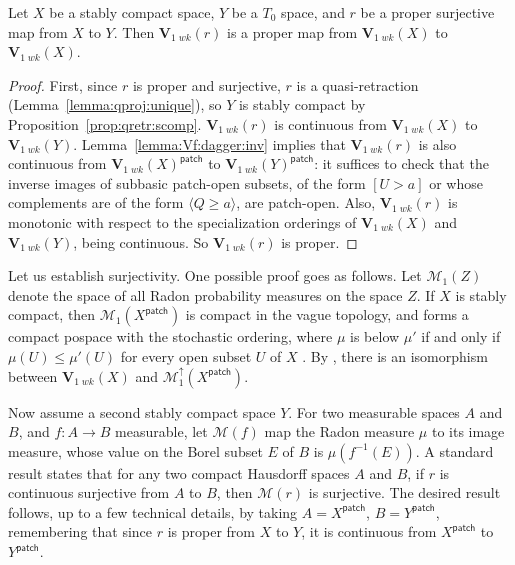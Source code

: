 \documentclass{LMCS}
\newcommand\Val{\mathbf V}
\newcommand\patch{{\mathsf{patch}}}
\begin{document}
\begin{prop}
  \label{prop:Vf:proper}
  Let $X$ be a stably compact space, $Y$ be a $T_0$ space, and $r$ be
  a proper surjective map from $X$ to $Y$.  Then $\Val_{1\;wk} (r)$ is
  a proper map from $\Val_{1\;wk} (X)$ to $\Val_{1\;wk} (X)$.
\end{prop}
\begin{proof}
  First, since $r$ is proper and surjective, $r$ is a quasi-retraction
  (Lemma~\ref{lemma:qproj:unique}), so $Y$ is stably compact by
  Proposition~\ref{prop:qretr:scomp}.  $\Val_{1\;wk} (r)$ is
  continuous from $\Val_{1\;wk} (X)$ to $\Val_{1\;wk} (Y)$.
  Lemma~\ref{lemma:Vf:dagger:inv} implies that $\Val_{1\;wk} (r)$ is
  also continuous from $\Val_{1\;wk} (X)^\patch$ to $\Val_{1\;wk}
  (Y)^\patch$: it suffices to check that the inverse images of
  subbasic patch-open subsets, of the form $[U > a]$ or whose
  complements are of the form $\langle Q \geq a\rangle$, are
  patch-open.  Also, $\Val_{1\;wk} (r)$ is monotonic with respect to
  the specialization orderings of $\Val_{1\;wk} (X)$ and $\Val_{1\;wk}
  (Y)$, being continuous.  So $\Val_{1\;wk} (r)$ is proper.
\end{proof}

Let us establish surjectivity.  One possible proof goes as follows.
Let $\mathcal M_1 (Z)$ denote the space of all Radon probability
measures on the space $Z$.  If $X$ is stably compact, then $\mathcal
M_1 (X^\patch)$ is compact in the vague topology, and forms a compact
pospace with the stochastic ordering, where $\mu$ is below $\mu'$ if
and only if $\mu (U) \leq \mu' (U)$ for every open subset $U$ of $X$
\cite[Theorem~31]{AMJK:scs:prob}.  By
\cite[Theorem~36]{AMJK:scs:prob}, there is an isomorphism between
$\Val_{1\;wk} (X)$ and $\mathcal M_1^\uparrow (X^\patch)$.

Now assume a second stably compact space $Y$.  For two measurable
spaces $A$ and $B$, and $f : A \to B$ measurable, let $\mathcal M (f)$
map the Radon measure $\mu$ to its image measure, whose value on the
Borel subset $E$ of $B$ is $\mu (f^{-1} (E))$.  A standard result
\cite[2.4, Lemma~1]{Bourbaki:int:IX} states that for any two compact
Hausdorff spaces $A$ and $B$, if $r$ is continuous surjective from $A$
to $B$, then $\mathcal M (r)$ is surjective.  The desired result
follows, up to a few technical details, by taking $A=X^\patch$,
$B=Y^\patch$, remembering that since $r$ is proper from $X$ to $Y$, it
is continuous from $X^\patch$ to $Y^\patch$.
\end{document}
